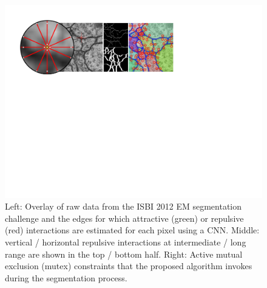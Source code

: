 \begin{figure}[t]
    \centering
    \includegraphics[width=1.\linewidth]{figures/MWS/images/fig1slimt.pdf}%
    \caption{Left: Overlay of raw data from the ISBI 2012 EM segmentation challenge and the edges for which attractive (green) or repulsive (red) interactions are estimated for each pixel using a CNN. Middle: vertical / horizontal repulsive interactions at intermediate / long range are shown in the top / bottom half. Right: Active mutual exclusion (mutex) constraints that the proposed algorithm invokes during the segmentation process.}
    \label{fig:main}
    \vspace{-0.05cm}
\end{figure}

